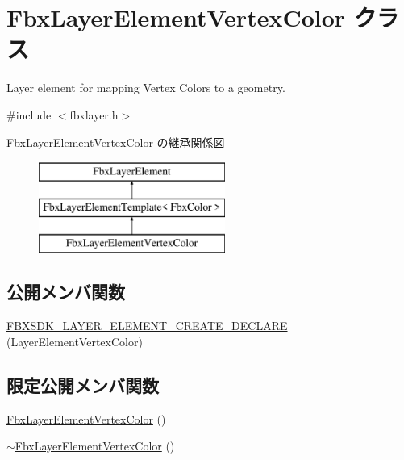 \hypertarget{class_fbx_layer_element_vertex_color}{}\section{Fbx\+Layer\+Element\+Vertex\+Color クラス}
\label{class_fbx_layer_element_vertex_color}


Layer element for mapping Vertex Colors to a geometry.  




{\ttfamily \#include $<$fbxlayer.\+h$>$}

Fbx\+Layer\+Element\+Vertex\+Color の継承関係図\begin{figure}[H]
\begin{center}
\leavevmode
\includegraphics[height=3.000000cm]{class_fbx_layer_element_vertex_color}
\end{center}
\end{figure}
\subsection*{公開メンバ関数}
\begin{DoxyCompactItemize}
\item 
\hyperlink{class_fbx_layer_element_vertex_color_a59477554ceb7a1082b9c0f6dd849626d}{F\+B\+X\+S\+D\+K\+\_\+\+L\+A\+Y\+E\+R\+\_\+\+E\+L\+E\+M\+E\+N\+T\+\_\+\+C\+R\+E\+A\+T\+E\+\_\+\+D\+E\+C\+L\+A\+RE} (Layer\+Element\+Vertex\+Color)
\end{DoxyCompactItemize}
\subsection*{限定公開メンバ関数}
\begin{DoxyCompactItemize}
\item 
\hyperlink{class_fbx_layer_element_vertex_color_a8b87bc51727c07c284d11acae71bca51}{Fbx\+Layer\+Element\+Vertex\+Color} ()
\item 
\hyperlink{class_fbx_layer_element_vertex_color_ab161106e55d95e1b21eec49f56296f30}{$\sim$\+Fbx\+Layer\+Element\+Vertex\+Color} ()
\end{DoxyCompactItemize}
